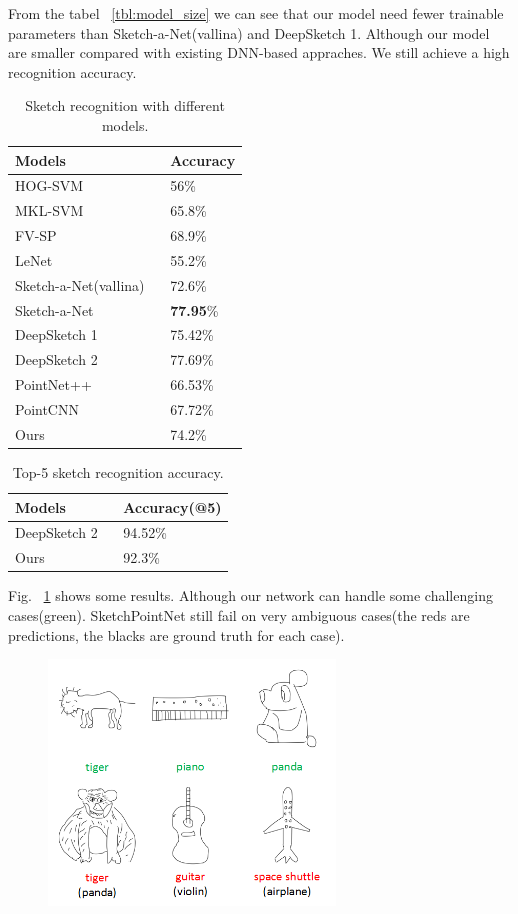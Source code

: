 From the tabel ~\ref{tbl:model_size} we can see that our model need fewer trainable parameters than Sketch-a-Net(vallina) and DeepSketch 1. Although our model are smaller compared with existing DNN-based appraches. We still achieve a high recognition accuracy.

\begin{table}[htbp]
\centering
\large
\begin{tabular}{ll}
    \hline
     Models &Accuracy\\
    \hline
     HOG-SVM ~\cite{Eitz2012HowDH}& 56\% \\
     MKL-SVM ~\cite{LiHSG15} & 65.8\% \\
     FV-SP ~\cite{Schneider2014SketchCA} & 68.9\% \\
     LeNet ~\cite{LeCun1998GradientbasedLA}& 55.2\% \\
     Sketch-a-Net(vallina) ~\cite{Yu2015SketchaNetTB}& 72.6\% \\
     Sketch-a-Net ~\cite{Yu2015SketchaNetTB}& \textbf{77.95}\% \\
     DeepSketch 1 ~\cite{Seddati2015DeepSketchDC}& 75.42\% \\
     DeepSketch 2 ~\cite{Dupont2016DeepSketch2D}& 77.69\% \\
     \hline
     PointNet++ ~\cite{qi2017pointnetplusplus}& 66.53\% \\
     PointCNN ~\cite{1801.07791}& 67.72\% \\
     Ours& 74.2\% \\
    \hline
\end{tabular}
\caption{Sketch recognition with different models.}
\label{tbl:acc}
\end{table}

\begin{table}[htbp]
\centering
\large
\begin{tabular}{ll}
    \hline
     Models &Accuracy(@5)\\
    \hline
     DeepSketch 2 ~\cite{Seddati2015DeepSketchDC}& 94.52\% \\
     Ours& 92.3\% \\
    \hline
\end{tabular}
\caption{Top-5 sketch recognition accuracy.}
\label{tbl:acc}
\end{table}

Fig. ~\ref{fig:resshow} shows some results. Although our network can handle some challenging cases(green). SketchPointNet still fail on very ambiguous cases(the reds are predictions, the blacks are ground truth for each case).

\begin{figure}[htbp]
    \center
    \includegraphics[width=3in]{images/res.png}
    \label{fig:resshow}
\end{figure}
